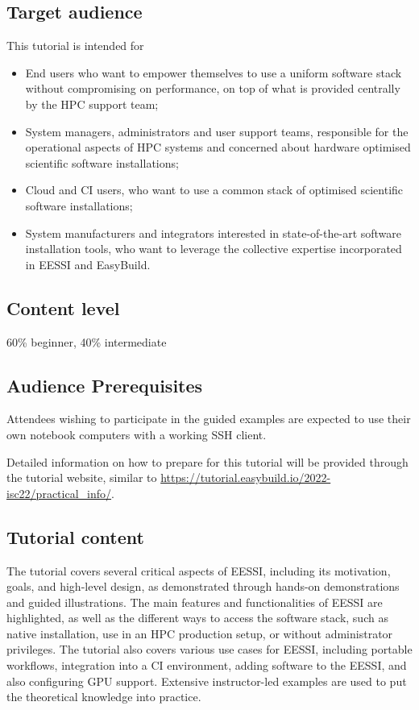 \subsection*{Target audience}
This tutorial is intended for
\begin{itemize}
    \item End users who want to empower themselves to use a uniform software stack without compromising on
          performance, on top of what is provided centrally by the HPC support team;
    \item System managers, administrators and user support teams, responsible for the operational aspects of HPC systems and concerned about
          hardware optimised scientific software installations;
    \item Cloud and CI users, who want to use a common stack of optimised scientific software installations;
    \item System manufacturers and integrators interested in state-of-the-art software installation tools, who want to
          leverage the collective expertise incorporated in EESSI and EasyBuild.
\end{itemize}

\subsection*{Content level}
60\% beginner, 40\% intermediate

\subsection*{Audience Prerequisites}
Attendees wishing to participate in the guided examples are expected to use their
own notebook computers with a working SSH client.

Detailed information on how to prepare for this tutorial will be provided
through the tutorial website, similar to
\url{https://tutorial.easybuild.io/2022-isc22/practical_info/}.

\subsection*{Tutorial content}
The tutorial covers several critical aspects of EESSI, including its motivation, goals, and high-level design, as
demonstrated through hands-on demonstrations and guided illustrations. The main features and functionalities of EESSI
are highlighted, as well as the different ways to access the software stack, such as native installation, use in an HPC
production setup, or without administrator privileges. The tutorial also covers various use cases for EESSI, including
portable workflows, integration into a CI environment, adding software to the EESSI, and also configuring GPU support.
Extensive instructor-led examples are used to put the theoretical knowledge into practice.

